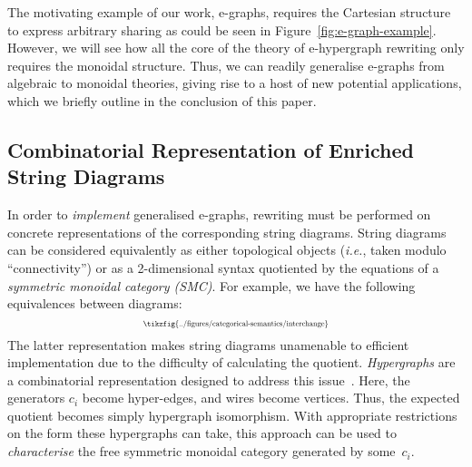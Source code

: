The motivating example of our work, e-graphs, requires the Cartesian structure to express arbitrary sharing as could be seen in Figure~\ref{fig:e-graph-example}.
However, we will see how all the core of the theory of e-hypergraph rewriting only requires the monoidal structure. 
Thus, we can readily generalise e-graphs from algebraic to monoidal theories, giving rise to a  host of new potential applications, which we briefly outline in the conclusion of this paper.   

\subsection{Combinatorial Representation of Enriched String Diagrams}

In order to \textit{implement} generalised e-graphs, rewriting must be performed on concrete representations of the corresponding string diagrams.  
String diagrams can be considered equivalently as either topological objects (\textit{i.e.}, taken modulo ``connectivity'') or as a 2-dimensional syntax quotiented by the equations of a \textit{symmetric monoidal category (SMC)}.
For example, we have the following equivalences between diagrams:
\[
	\scalebox{0.6}{
	\tikzfig{../figures/categorical-semantics/interchange}
	}
\]
The latter representation makes string diagrams unamenable to efficient implementation due to the difficulty of calculating the quotient.
\emph{Hypergraphs} are a combinatorial representation designed to address this issue~\cite{bonchi_string_2022-1,bonchi_string_2022-2,bonchi_string_2022-3}.
Here, the generators $c_i$ become hyper-edges,  and wires become vertices.  
Thus, the expected quotient becomes simply hypergraph isomorphism. 
With appropriate restrictions on the form these hypergraphs can take, this approach can be used to \textit{characterise} the free symmetric monoidal category generated by some~$c_i$. 

